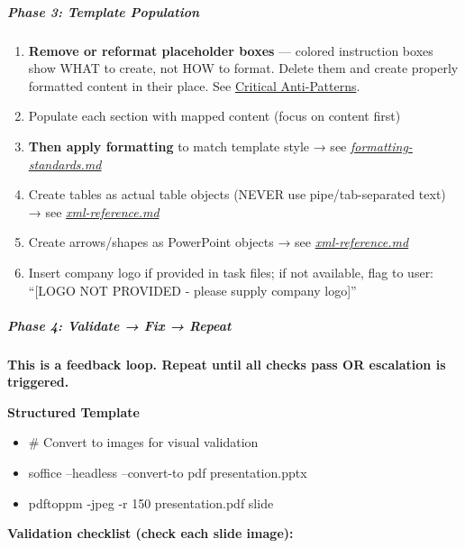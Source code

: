\documentclass[11pt]{article}
\begin{document}
\subparagraph{Phase 3: Template Population}\mbox{}\par
\begin{enumerate}[leftmargin=*,itemsep=2pt,topsep=2pt]
\item {} \textbf{Remove or reformat placeholder boxes} — colored instruction boxes show WHAT to create, not HOW to format. Delete them and create properly formatted content in their place. See \href{\#critical-anti-patterns-never-do-these}{Critical Anti-Patterns}.
\item {} Populate each section with mapped content (focus on content first)
\item {} \textbf{Then apply formatting} to match template style → see \href{reference/formatting-standards.md}{\emph{formatting-standards.md}}
\item {} Create tables as actual table objects (NEVER use pipe/tab-separated text) → see \href{reference/xml-reference.md\#table-implementation}{\emph{xml-reference.md}}
\item {} Create arrows/shapes as PowerPoint objects → see \href{reference/xml-reference.md\#arrow-shapes}{\emph{xml-reference.md}}
\item {} Insert company logo if provided in task files; if not available, flag to user: ``[LOGO NOT PROVIDED - please supply company logo]''
\end{enumerate}

\subparagraph{Phase 4: Validate → Fix → Repeat}\mbox{}\par

\textbf{This is a feedback loop. Repeat until all checks pass OR escalation is triggered.}


\textbf{Structured Template}
\begin{itemize}[leftmargin=*,itemsep=2pt,topsep=2pt]
\item {} \# Convert to images for visual validation
\item {} soffice --headless --convert-to pdf presentation.pptx
\item {} pdftoppm -jpeg -r 150 presentation.pdf slide
\end{itemize}

\textbf{Validation checklist (check each slide image):}
\end{document}
